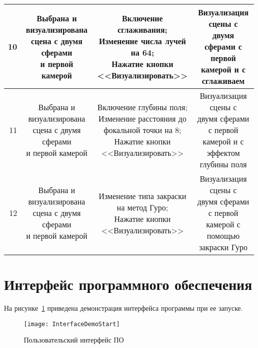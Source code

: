 \begin{longtable}{|r|c|c|c|}
	10 & \makecell{Выбрана и \\визуализирована \\сцена с двумя сферами\\и первой камерой} & \makecell{Включение сглаживания;\\Изменение числа лучей на 64;\\Нажатие кнопки\\<<Визуализировать>>} & \makecell{Визуализация сцены с \\двумя сферами с первой\\камерой и с сглаживаем} \\ \hline
	11 & \makecell{Выбрана и \\визуализирована \\сцена с двумя сферами\\и первой камерой} & \makecell{Включение глубины поля;\\Изменение расстояния до\\фокальной точки на 8;\\Нажатие кнопки\\<<Визуализировать>>} & \makecell{Визуализация сцены с \\двумя сферами с первой\\камерой и с эффектом \\глубины поля} \\ \hline
	12 & \makecell{Выбрана и \\визуализирована \\сцена с двумя сферами\\и первой камерой} & \makecell{Изменение типа закраски\\на метод Гуро;\\Нажатие кнопки\\<<Визуализировать>>} & \makecell{Визуализация сцены с \\двумя сферами с первой\\камерой с помощью \\закраски Гуро} \\ \hline
\end{longtable}

\section{Интерфейс программного обеспечения}
На рисунке~\ref{fig:InterfaceDemoStart} приведена демонстрация интерфейса программы при ее запуске.
\begin{figure}[H]
	\centering
	\texttt{[image: InterfaceDemoStart]}
	\caption{Пользовательский интерфейс ПО}
	\label{fig:InterfaceDemoStart}
\end{figure}

